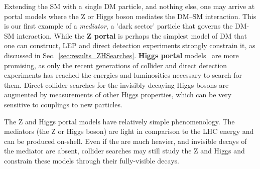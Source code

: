 
Extending the SM with a single DM particle, and nothing else, one may arrive at portal models where the Z or Higgs boson mediates the DM--SM interaction.%
This is our first example of a {\it mediator}, a 'dark sector' particle that governs the DM-SM interaction.
While the \textbf{Z portal} is perhaps the simplest model of DM that one can construct, LEP and direct detection experiments strongly constrain it, as discussed in Sec.~\ref{sec:results_ZHSearches}. 
\textbf{Higgs portal} models~\cite{Patt:2006fw,Englert:2011yb,Djouadi:2011aa} are more promising, as only the recent generations of collider and direct detection experiments has reached the energies and luminosities necessary to search for them.%
Direct collider searches for the invisibly-decaying Higgs bosons are augmented by measurements of other Higgs properties, which can be very sensitive to couplings to new particles.

The Z and Higgs portal models have relatively simple phenomenology.
The mediators (the Z or Higgs boson) are light in comparison to the LHC energy and can be produced on-shell.
Even if the \IP are much heavier, and invisible decays of the mediator are absent, collider searches may still study the Z and Higgs and constrain these models through their fully-visible decays.





